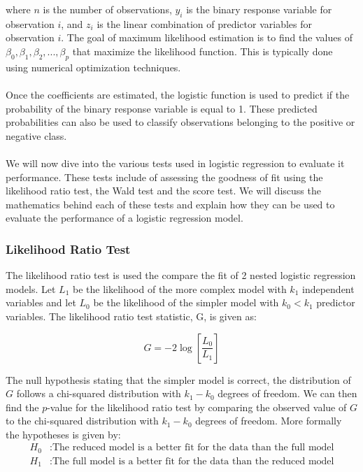 \documentclass{article}[12pt]
\theoremstyle{definition}
\begin{document}
\noindent
where $n$ is the number of observations, $y_i$ is the binary response variable for observation $i$, and $z_i$ is the linear combination of predictor variables for observation $i$. The goal of maximum likelihood estimation is to find the values of $\beta_0, \beta_1, \beta_2, ..., \beta_p$ that maximize the likelihood function. This is typically done using numerical optimization techniques.
\\
\\
Once the coefficients are estimated, the logistic function is used to predict if the probability of the binary response variable is equal to 1. These predicted probabilities can also be used to classify observations belonging to the positive or negative class.
\\
\\
We will now dive into the various tests used in logistic regression to evaluate it performance. These tests include of assessing the goodness of fit using the likelihood ratio test, the Wald test and the score test. We will discuss the mathematics behind each of these tests and explain how they can be used to evaluate the performance of a logistic regression model. 

\newpage

\bigskip

\subsubsection{Likelihood Ratio Test}

\bigskip

The likelihood ratio test is used the compare the fit of 2 nested logistic regression models. Let $L_1$ be the likelihood of the more complex model with $k_1$ independent variables and let $L_0$ be the likelihood of the simpler model with $k_0 < k_1$ predictor variables. The likelihood ratio test statistic, G, is given as:

\medskip

$$ G = -2 \log \left[ \frac{L_0}{L_1} \right] $$

\medskip

\noindent
The null hypothesis stating that the simpler model is correct, the distribution of $G$ follows a chi-squared distribution with $k_1 - k_0$ degrees of freedom. We can then find the $p$-value for the likelihood ratio test by comparing the observed value of $G$ to the chi-squared distribution with $k_1 - k_0$ degrees of freedom. More formally the hypotheses is given by:
\begin{align*}
H_0&: \text{The reduced model is a better fit for the data than the full model} \\
H_1&: \text{The full model is a better fit for the data than the reduced model} 
\end{align*}
\end{document}
